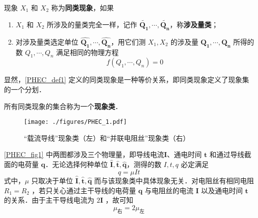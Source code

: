 \begin{definition}{}\label{PHEC_def1}
现象 $X_1$ 和 $X_2$ 称为\textbf{同类现象}，如果
\begin{enumerate}
\item $X_1$ 和 $X_2$ 所涉及的量类完全一样，记作 $\tilde{\boldsymbol{Q_1}},\cdots,\tilde{\boldsymbol{Q_n}}$，称\textbf{涉及量类}； 
\item 对涉及量类选定单位 $\hat{\boldsymbol{Q_1}},\cdots,\hat{\boldsymbol{Q_n}}$，用它们测 $X_1,X_2$ 的涉及量 $\boldsymbol{Q_1},\cdots ,\boldsymbol{Q_n}$ 所得的数 $Q_1,\cdots,Q_n$ 满足相同的物理方程
\begin{equation}
f(Q_1,\cdots,Q_n)=0
\end{equation}
\end{enumerate}
\end{definition}
显然，\autoref{PHEC_def1} 定义的同类现象是一种等价关系，即同类现象定义了现象集的一个分划．
\begin{definition}{}
所有同类现象的集合称为一个\textbf{现象类}．
\end{definition}
\begin{example}{}
\begin{figure}[ht]
\centering
\texttt{[image: ./figures/PHEC\_1.pdf]}
\caption{“载流导线”现象类（左）和“并联电阻丝”现象类（右）} \label{PHEC_fig1}
\end{figure}
\autoref{PHEC_fig1} 中两图都涉及三个物理量，即导线电流$\boldsymbol{I}$、通电时间 $\boldsymbol{t}$ 和通过导线截面的电荷量 $\boldsymbol{q}$．无论选择何种单位 $\hat{\boldsymbol{I}},\hat{\boldsymbol{t}},\hat{\boldsymbol{q}}$，测得的数 $I,t,q$ 必定满足
\begin{equation}
q=\mu It
\end{equation}
式中，$\mu$ 只取决于单位 $\hat{\boldsymbol{I}},\hat{\boldsymbol{t}},\hat{\boldsymbol{q}}$ 而与该现象类中具体现象无关．对电阻丝有相同电阻 $R_1=R_2$ ，若只关心通过主干导线的电荷量 $\boldsymbol{q}$ 与电阻丝的电流 $\boldsymbol{I}$ 以及通电时间 $\boldsymbol{t}$ 的关系．由于主干导线电流为 $2\boldsymbol{I}$ ，故可知 
\begin{equation}
\mu_{\text{右}}=2\mu_{\text{左}}
\end{equation}
\end{example}